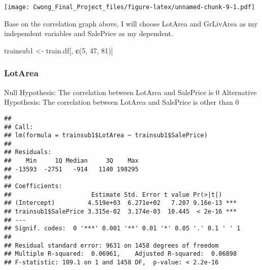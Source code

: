 \documentclass[]{article}
\newenvironment{Shaded}{\begin{snugshade}}{\end{snugshade}}
\newcommand{\KeywordTok}[1]{\textcolor[rgb]{0.13,0.29,0.53}{\textbf{#1}}}
\newcommand{\DataTypeTok}[1]{\textcolor[rgb]{0.13,0.29,0.53}{#1}}
\newcommand{\DecValTok}[1]{\textcolor[rgb]{0.00,0.00,0.81}{#1}}
\newcommand{\StringTok}[1]{\textcolor[rgb]{0.31,0.60,0.02}{#1}}
\newcommand{\OperatorTok}[1]{\textcolor[rgb]{0.81,0.36,0.00}{\textbf{#1}}}
\newcommand{\NormalTok}[1]{#1}
\begin{document}
\texttt{[image: Cwong\_Final\_Project\_files/figure-latex/unnamed-chunk-9-1.pdf]}

Base on the correlation graph above, I will choose LotArea and GrLivArea
as my independent variables and SalePrice as my dependent.

\begin{Shaded}
\begin{Highlighting}[]
\NormalTok{trainsub1 <-}\StringTok{ }\NormalTok{train.df[, }\KeywordTok{c}\NormalTok{(}\DecValTok{5}\NormalTok{, }\DecValTok{47}\NormalTok{, }\DecValTok{81}\NormalTok{)]}
\end{Highlighting}
\end{Shaded}

\subsubsection{LotArea}\label{lotarea}

Null Hypothesis: The correlation between LotArea and SalePrice is 0
Alternative Hypothesis: The correlation between LotArea and SalePrice is
other than 0

\begin{Shaded}
\end{Shaded}

\begin{verbatim}
## 
## Call:
## lm(formula = trainsub1$LotArea ~ trainsub1$SalePrice)
## 
## Residuals:
##    Min     1Q Median     3Q    Max 
## -13593  -2751   -914   1140 198295 
## 
## Coefficients:
##                      Estimate Std. Error t value Pr(>|t|)    
## (Intercept)         4.519e+03  6.271e+02   7.207 9.16e-13 ***
## trainsub1$SalePrice 3.315e-02  3.174e-03  10.445  < 2e-16 ***
## ---
## Signif. codes:  0 '***' 0.001 '**' 0.01 '*' 0.05 '.' 0.1 ' ' 1
## 
## Residual standard error: 9631 on 1458 degrees of freedom
## Multiple R-squared:  0.06961,    Adjusted R-squared:  0.06898 
## F-statistic: 109.1 on 1 and 1458 DF,  p-value: < 2.2e-16
\end{verbatim}

\begin{Shaded}
\end{Shaded}
\end{document}
